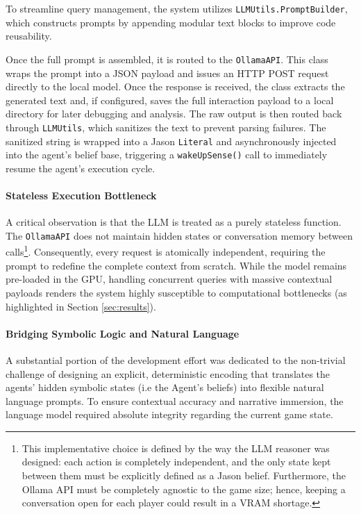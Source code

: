 To streamline query management, the system utilizes \texttt{LLMUtils.PromptBuilder}, which constructs prompts by appending modular text blocks to improve code reusability.

Once the full prompt is assembled, it is routed to the \texttt{OllamaAPI}. This class wraps the prompt into a JSON payload and issues an HTTP POST request directly to the local model. Once the response is received, the class extracts the generated text and, if configured, saves the full interaction payload to a local directory for later debugging and analysis. The raw output is then routed back through \texttt{LLMUtils}, which sanitizes the text to prevent parsing failures. The sanitized string is wrapped into a Jason \texttt{Literal} and asynchronously injected into the agent's belief base, triggering a \texttt{wakeUpSense()} call to immediately resume the agent's execution cycle.

\paragraph{Stateless Execution Bottleneck}
A critical observation is that the LLM is treated as a purely stateless function. The \texttt{OllamaAPI} does not maintain hidden states or conversation memory between calls\footnote{This implementative choice is defined by the way the LLM reasoner was designed: each action is completely independent, and the only state kept between them must be explicitly defined as a Jason belief. Furthermore, the Ollama API must be completely agnostic to the game size; hence, keeping a conversation open for each player could result in a VRAM shortage.}. Consequently, every request is atomically independent, requiring the prompt to redefine the complete context from scratch. While the model remains pre-loaded in the GPU, handling concurrent queries with massive contextual payloads renders the system highly susceptible to computational bottlenecks (as highlighted in Section \ref{sec:results}).


\paragraph{Bridging Symbolic Logic and Natural Language}
A substantial portion of the development effort was dedicated to the non-trivial challenge of designing an explicit, deterministic encoding that translates the agents' hidden symbolic states (i.e the Agent's beliefs) into flexible natural language prompts. To ensure contextual accuracy and narrative immersion, the language model required absolute integrity regarding the current game state. 

